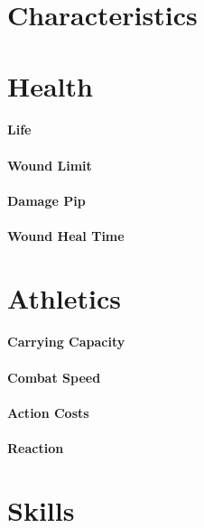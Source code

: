 \section{Characteristics}

\section{Health}

\paragraph{Life}

\paragraph{Wound Limit}

\paragraph{Damage Pip}

\paragraph{Wound Heal Time}

\section{Athletics}
\paragraph{Carrying Capacity}

\paragraph{Combat Speed}

\paragraph{Action Costs}

\paragraph{Reaction}


\section{Skills}

